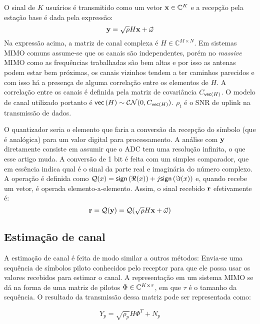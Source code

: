 \documentclass{article}
\begin{document}
	O sinal de $K$ usuários é transmitido como um vetor $\mathbf{x}\in\mathbb{C}^{K}$ e a recepção pela estação base é dada pela expressão:
	\begin{equation}
		\mathbf{y}=\sqrt{\rho}H\mathbf{x}+\vec{\omega}
		\label{eq:recepcao_sinal_mimo}
	\end{equation}
	Na expressão acima, a matriz de canal complexa é $H\in\mathbb{C}^{M\times N}$. Em sistemas MIMO comuns assume-se que os canais são independentes, porém no \textit{massive} MIMO como as frequências trabalhadas são bem altas e por isso as antenas podem estar bem próximas, os canais vizinhos tendem a ter caminhos parecidos e com isso há a presença de alguma correlação entre os elementos de $H$. A correlação entre os canais é definida pela matriz de covariância $C_{ \mathsf{vec} \left( H \right) }$. O modelo de canal utilizado portanto é $ \mathsf{vec} \left( H \right) \sim\mathcal{C}\mathcal{N}(0,C_{ \mathsf{vec} \left( H \right) })$. $\rho_t$ é o SNR de uplink na transmissão de dados.
	
	O quantizador seria o elemento que faria a conversão da recepção do símbolo (que é analógica) para um valor digital para processamento. A análise com $\mathbf{y}$ diretamente consiste em assumir que o ADC tem uma resolução infinita, o que esse artigo muda. A conversão de 1 bit é feita com um simples comparador, que em essência indica qual é o sinal da parte real e imaginária do número complexo. A operação é definida como $\mathcal{Q}(x)= \mathsf{sign} \left( \Re(x) \right) +j \mathsf{sign} \left( \Im(x) \right) $ e, quando recebe um vetor, é operada elemento-a-elemento. Assim, o sinal recebido $\mathbf{r}$ efetivamente é:
	\begin{equation}
		\mathbf{r}=\mathcal{Q}(\mathbf{y})=\mathcal{Q}(\sqrt{\rho}H\mathbf{x}+\vec{\omega})
		\label{eq:sinal_recebido_quantizado}
	\end{equation}

	\subsection{Estimação de canal}
	
	A estimação de canal é feita de modo similar a outros métodos: Envia-se uma sequência de símbolos piloto conhecidos pelo receptor para que ele possa usar os valores recebidos para estimar o canal. A representação em um sistema MIMO se dá na forma de uma matriz de pilotos $\Phi\in\mathbb{C}^{K\times \tau}$, em que $\tau$ é o tamanho da sequência. O resultado da transmissão dessa matriz pode ser representada como:

	\begin{equation}
		Y_p = \sqrt{\rho_p}H\Phi^T+N_p
		\label{eq:recepcao_sinal_treinamento}
	\end{equation}
\end{document}
